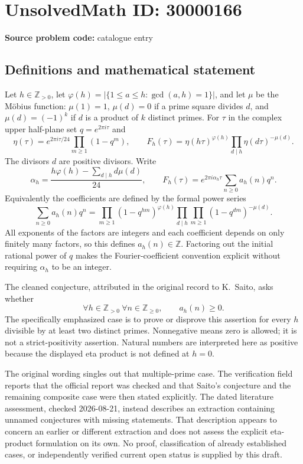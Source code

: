 \documentclass[11pt]{article}
\newcommand{\Z}{\mathbb{Z}}
\begin{document}
\section*{UnsolvedMath ID: 30000166}
\textbf{Source problem code:} catalogue entry
\subsection{Definitions and mathematical statement}
Let \(h\in\Z_{>0}\), let \(\varphi(h)=|\{1\leq a\leq h:\gcd(a,h)=1\}|\), and let \(\mu\) be the M\"obius function: \(\mu(1)=1\), \(\mu(d)=0\) if a prime square divides \(d\), and \(\mu(d)=(-1)^k\) if \(d\) is a product of \(k\) distinct primes. For \(\tau\) in the complex upper half-plane set \(q=e^{2\pi i\tau}\) and
\[
 \eta(\tau)=e^{2\pi i\tau/24}\prod_{m\geq1}(1-q^m),\qquad
 F_h(\tau)=\eta(h\tau)^{\varphi(h)}\prod_{d\mid h}\eta(d\tau)^{-\mu(d)}.
\]
The divisors \(d\) are positive divisors. Write
\[
 \alpha_h=\frac{h\varphi(h)-\sum_{d\mid h}d\mu(d)}{24},\qquad
 F_h(\tau)=e^{2\pi i\alpha_h\tau}\sum_{n\geq0}a_h(n)q^n.
\]
Equivalently the coefficients are defined by the formal power series
\[
 \sum_{n\geq0}a_h(n)q^n
 =\prod_{m\geq1}(1-q^{hm})^{\varphi(h)}
   \prod_{d\mid h}\prod_{m\geq1}(1-q^{dm})^{-\mu(d)}.
\]
All exponents of the factors are integers and each coefficient depends on only finitely many factors, so this defines \(a_h(n)\in\Z\). Factoring out the initial rational power of \(q\) makes the Fourier-coefficient convention explicit without requiring \(\alpha_h\) to be an integer.

The cleaned conjecture, attributed in the original record to K.\ Saito, asks whether
\[
 \forall h\in\Z_{>0}\ \forall n\in\Z_{\geq0},\qquad a_h(n)\geq0.
\]
The specifically emphasized case is to prove or disprove this assertion for every \(h\) divisible by at least two distinct primes. Nonnegative means zero is allowed; it is not a strict-positivity assertion. Natural numbers are interpreted here as positive because the displayed eta product is not defined at \(h=0\).

The original wording singles out that multiple-prime case. The verification field reports that the official report was checked and that Saito's conjecture and the remaining composite case were then stated explicitly. The dated literature assessment, checked 2026-08-21, instead describes an extraction containing unnamed conjectures with missing statements. That description appears to concern an earlier or different extraction and does not assess the explicit eta-product formulation on its own. No proof, classification of already established cases, or independently verified current open status is supplied by this draft.
\end{document}
